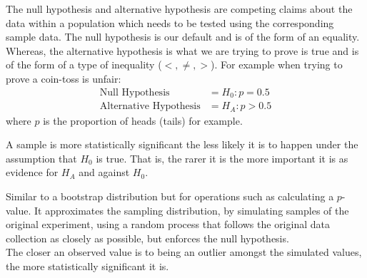 \documentclass[12pt]{article}
\begin{document}
\begin{tcolorbox}[title=Null \& Alternative Hypotheses]
    The null hypothesis and alternative hypothesis are competing claims about the data within a population which needs to be tested using the corresponding sample data. The null hypothesis is our default and is of the form of an equality. Whereas, the alternative hypothesis is what we are trying to prove is true and is of the form of a type of inequality ($<, \ne, >$). For example when trying to prove a coin-toss is unfair:
    \begin{align*}
        \text{Null Hypothesis} &= H_0 : p=0.5\\
        \text{Alternative Hypothesis} &= H_A : p>0.5
    \end{align*}
    where $p$ is the proportion of heads (tails) for example.
\end{tcolorbox}

\begin{tcolorbox}[title=Statistical Significance]
    A sample is more statistically significant the less likely it is to happen under the assumption that $H_0$ is true. That is, the rarer it is the more important it is as evidence for $H_A$ and against $H_0$.
\end{tcolorbox}

\begin{tcolorbox}[title=Randomization Distribution (RD)]
    Similar to a bootstrap distribution but for operations such as calculating a $p$-value. It approximates the sampling distribution, by simulating samples of the original experiment, using a random process that follows the original data collection as closely as possible, but enforces the null hypothesis.\\
    The closer an observed value is to being an outlier amongst the simulated values, the more statistically significant it is.
\end{tcolorbox}
\end{document}
